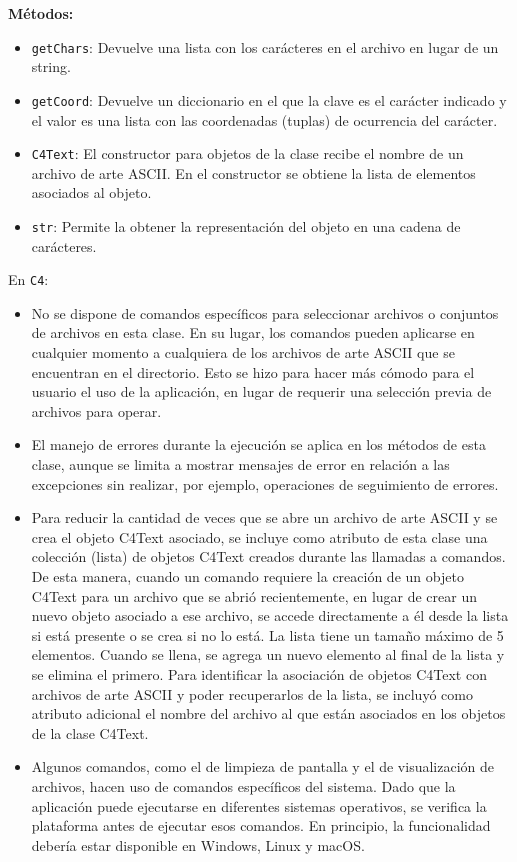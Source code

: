\documentclass[a4paper,12pt]{article}
\begin{document}
\textbf{Métodos:}
\begin{itemize}
  \item \texttt{getChars}: Devuelve una lista con los carácteres en el archivo en lugar de un string.
  \item \texttt{getCoord}: Devuelve un diccionario en el que la clave es el carácter indicado y el valor es una lista con las coordenadas (tuplas) de ocurrencia del carácter.
  \item \texttt{C4Text}: El constructor para objetos de la clase recibe el nombre de un archivo de arte ASCII. En el constructor se obtiene la lista de elementos asociados al objeto.
  \item\texttt{str}: Permite la obtener la representación del objeto en una cadena de carácteres.
\end{itemize}


En \texttt{C4}:
\begin{itemize}
    \item No se dispone de comandos específicos para seleccionar archivos o conjuntos de archivos en esta clase. En su lugar, los comandos pueden aplicarse en cualquier momento a cualquiera de los archivos de arte ASCII que se encuentran en el directorio. Esto se hizo para hacer más cómodo para el usuario el uso de la aplicación, en lugar de requerir una selección previa de archivos para operar.
    \item El manejo de errores durante la ejecución se aplica en los métodos de esta clase, aunque se limita a mostrar mensajes de error en relación a las excepciones sin realizar, por ejemplo, operaciones de seguimiento de errores.
    \item Para reducir la cantidad de veces que se abre un archivo de arte ASCII y se crea el objeto C4Text asociado, se incluye como atributo de esta clase una colección (lista) de objetos C4Text creados durante las llamadas a comandos. De esta manera, cuando un comando requiere la creación de un objeto C4Text para un archivo que se abrió recientemente, en lugar de crear un nuevo objeto asociado a ese archivo, se accede directamente a él desde la lista si está presente o se crea si no lo está. La lista tiene un tamaño máximo de 5 elementos. Cuando se llena, se agrega un nuevo elemento al final de la lista y se elimina el primero. Para identificar la asociación de objetos C4Text con archivos de arte ASCII y poder recuperarlos de la lista, se incluyó como atributo adicional el nombre del archivo al que están asociados en los objetos de la clase C4Text.
    \item Algunos comandos, como el de limpieza de pantalla y el de visualización de archivos, hacen uso de comandos específicos del sistema. Dado que la aplicación puede ejecutarse en diferentes sistemas operativos, se verifica la plataforma antes de ejecutar esos comandos. En principio, la funcionalidad debería estar disponible en Windows, Linux y macOS.
\end{itemize}
\end{document}
